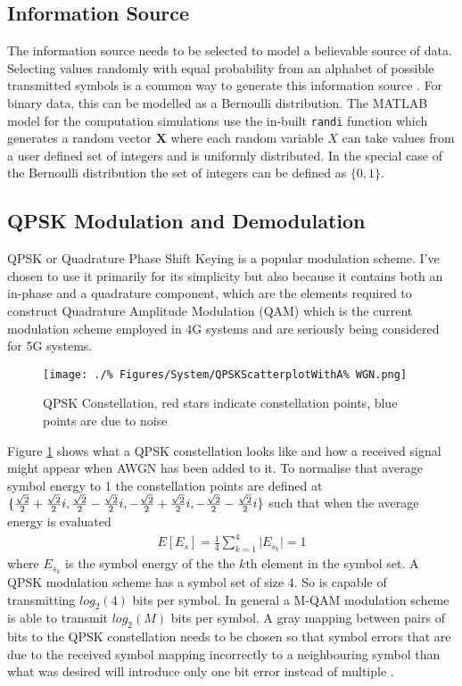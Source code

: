 \subsection{Information Source}
The information source needs to be selected to %
model a believable source of data. Selecting %
values randomly with equal probability from %
an alphabet of possible transmitted symbols %
is a common way to generate this information %
source \cite{Jer00}. For binary data, this %
can be modelled as a Bernoulli distribution. %
The MATLAB model for the computation %
simulations use the in-built \texttt{randi} %
\cite{randi} function which generates %
a random vector $\mathbf{X}$ where %
each random variable $X$ can take values %
from a user defined set of integers and is %
uniformly distributed. In the special %
case of the Bernoulli distribution %
the set of integers can be defined as $\{0,1\}$.

\subsection{QPSK Modulation and Demodulation}
\FloatBarrier
QPSK or Quadrature Phase Shift Keying is a popular %
modulation scheme. I've chosen to use it primarily %
for its simplicity but also because it contains both
an in-phase and a quadrature component, which are %
the elements required to construct %
Quadrature Amplitude Modulation (QAM) %
which is the current modulation scheme employed %
in 4G systems \cite{Rumney13}
and are seriously being considered for 5G systems.
\begin{figure}[ht]
	\centering
	\texttt{[image: ./\%
	Figures/System/QPSKScatterplotWithA\%
	WGN.png]}
	\caption{QPSK Constellation, red stars %
	indicate constellation points, blue %
	points are due to noise}
	\label{fig:QPSKConstellation}
\end{figure}

Figure \ref{fig:QPSKConstellation} shows what %
a QPSK constellation looks like and how a %
received signal might appear when AWGN has %
been added to it. To normalise that average %
symbol energy to 1 the constellation points %
are defined at $\{\frac{\sqrt{2}}{2} + \frac{%
\sqrt{2}}{2}i, \frac{\sqrt{2}}{2} - %
\frac{\sqrt{2}}{2}i, -\frac{\sqrt{2}%
}{2} + \frac{\sqrt{2}}{2}i, %
-\frac{\sqrt{2}}{2} - \frac{\sqrt{2}%
}{2}i\}$ such that when the average %
energy is evaluated
\begin{align}
	E\left[E_s\right] = \frac{1}{4} \sum_{k=1}^{4} %
	\lvert E_{s_{k}} \rvert = 1
\end{align}
where $E_{s_{k}}$ is the symbol energy of the the %
$k\text{th}$ element in the symbol set. A QPSK %
modulation scheme has a symbol set of size $4$. %
So is capable of transmitting $log_{2}(4)$ bits %
per symbol. In general a M-QAM modulation scheme %
is able to transmit $log_{2}(M)$ bits per symbol. %
A gray mapping between pairs of bits to the QPSK %
constellation needs to be chosen so that symbol %
errors that are due to the received symbol mapping %
incorrectly to a neighbouring symbol than what was %
desired will introduce only one bit error instead %
of multiple \cite{Sklar01,Goldsmith05}.

